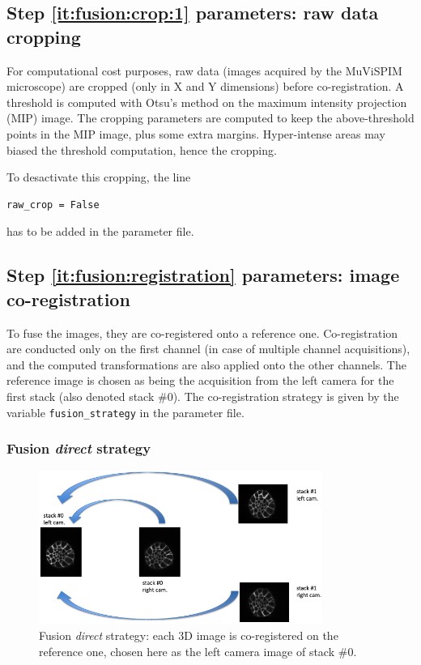 \subsection{Step \ref{it:fusion:crop:1} parameters: raw data cropping}
\label{sec:cli:fuse:raw:data:cropping}

For computational cost purposes, raw data (images acquired by the MuViSPIM microscope) are cropped (only in X and Y dimensions) before co-registration. A threshold is computed with Otsu's method \cite{otsu:tsmc:1979} on the maximum intensity projection (MIP) image. The cropping parameters are computed to keep the above-threshold points in the MIP image, plus some extra margins. Hyper-intense areas may biased the threshold computation, hence the cropping.

To desactivate this cropping, the line
\begin{verbatim}
raw_crop = False
\end{verbatim}
has to be added in the parameter file.

\subsection{Step \ref{it:fusion:registration} parameters: image co-registration}
\label{sec:cli:fuse:image:coregistration}

To fuse the images, they are co-registered onto a reference one. Co-registration are conducted only on the first channel (in case of multiple channel acquisitions), and the computed transformations are also applied onto the other channels. The reference image is chosen as being the acquisition from the left camera for the first stack (also denoted stack \#0). The co-registration strategy is given by the variable \texttt{fusion\_strategy} in the parameter file.


\subsubsection{Fusion \textit{direct} strategy}

\begin{figure}
\begin{center}
\includegraphics[height=50mm]{figures/fusion-direct-strategy.png}
\end{center}
\caption{\label{fig:cli:fuse:direct:strategy} Fusion \textit{direct} strategy: each 3D image is co-registered on the reference one, chosen here as the left camera image of stack \#0.}
\end{figure}


